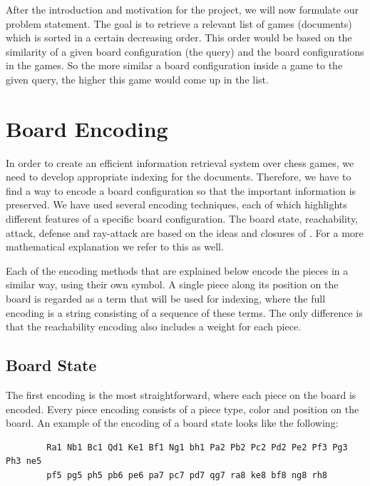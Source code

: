 \documentclass[11pt]{article}
\begin{document}
    After the introduction and motivation for the project, we will now formulate our problem statement. The goal is to retrieve a relevant list of games (documents) which is sorted in a certain decreasing order. This order would be based on the similarity of a given board configuration (the query) and the board configurations in the games. So the more similar a board configuration inside a game to the given query, the higher this game would come up in the list.



    \section{Board Encoding}

    In order to create an efficient information retrieval system over chess games, we need to develop appropriate indexing for the documents. Therefore, we have to find a way to encode a board configuration so that the important information is preserved. We have used several encoding techniques, each of which highlights different features of a specific board configuration. The board state, reachability, attack, defense and ray-attack are based on the ideas and closures of \cite{SimilarChessPositions}. For a more mathematical explanation we refer to this as well.

    Each of the encoding methods that are explained below encode the pieces in a similar way, using their own symbol. A single piece along its position on the board is regarded as a term that will be used for indexing, where the full encoding is a string consisting of a sequence of these terms. The only difference is that the reachability encoding also includes a weight for each piece.

    \subsection{Board State}

    The first encoding is the most straightforward, where each piece on the board is encoded. Every piece encoding consists of a piece type, color and position on the board. An example of the encoding of a board state looks like the following:

    \begin{BVerbatim}
        Ra1 Nb1 Bc1 Qd1 Ke1 Bf1 Ng1 bh1 Pa2 Pb2 Pc2 Pd2 Pe2 Pf3 Pg3 Ph3 ne5
        pf5 pg5 ph5 pb6 pe6 pa7 pc7 pd7 qg7 ra8 ke8 bf8 ng8 rh8
    \end{BVerbatim}
\end{document}
